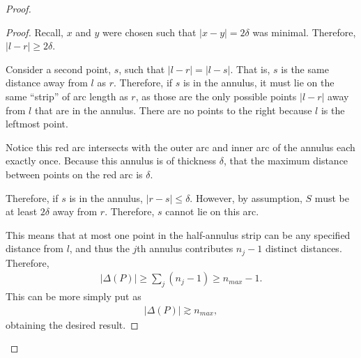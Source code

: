 \documentclass{scrippsthesisclass}
\theoremstyle{definition}
\begin{document}
\begin{proof}
\begin{proof}
    Recall, $x$ and $y$ were chosen such that $|x-y| = 2\delta$ was minimal.
    Therefore, $|l - r| \geq 2\delta$. 

    Consider a second point, $s$, such that $|l - r| = |l - s|$. 
    That is, $s$ is the same distance away from $l$ as $r$. 
    Therefore, if $s$ is in the annulus, it must lie on the same ``strip'' of arc length as $r$, as those are the only possible points $|l - r|$ away from $l$ that are in the annulus.
    There are no points to the right because $l$ is the leftmost point.

    \begin{center}
\end{center}

    Notice this red arc intersects with the outer arc and inner arc of the annulus each exactly once.
    Because this annulus is of thickness $\delta$, that the maximum distance between points on the red arc is $\delta$.

    Therefore, if $s$ is in the annulus, $|r - s| \leq \delta$.
    However, by assumption, $S$ must be at least $2\delta$ away from $r$.
    Therefore, $s$ cannot lie on this arc.
    
    This means that at most one point in the half-annulus strip can be any specified distance from $l$, and thus the $j$th annulus contributes $n_j - 1$ distinct distances.
    Therefore,
    \begin{align}
    \left|\Delta(P)\right| \geq \sum_{j} (n_j - 1) \geq n_{max} -1.
    \end{align}
    This can be more simply put as
    \begin{align}
        \left|\Delta(P)\right|  \gtrsim n_{max},
    \end{align}
    obtaining the desired result.
    \end{proof}


\end{proof}
\end{document}
